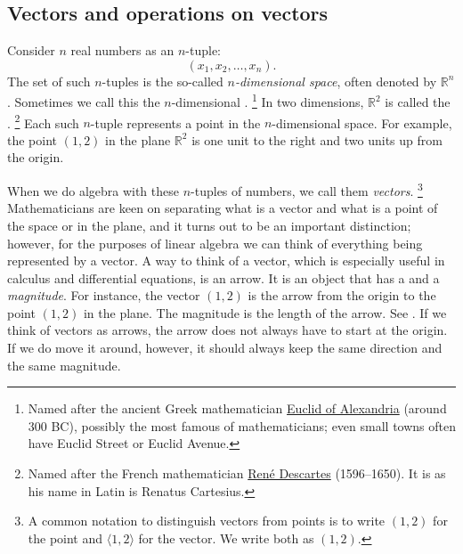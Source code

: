 \subsection{Vectors and operations on vectors}

Consider $n$ real numbers as an $n$-tuple:
\begin{equation*}
(x_1,x_2,\ldots,x_n).
\end{equation*}
The set of such $n$-tuples is the so-called
\emph{$n$-dimensional space},
often denoted by ${\mathbb R}^n$.
Sometimes we call this the $n$-dimensional
\emph{}.%
\footnote{Named after the ancient Greek mathematician
\href{https://en.wikipedia.org/wiki/Euclid}{Euclid of Alexandria}
(around 300 BC), possibly the most famous of mathematicians; even
small towns often have Euclid Street or Euclid Avenue.}
In two dimensions, ${\mathbb R}^2$ is called the
\emph{}.%
\footnote{Named after the French mathematician
\href{https://en.wikipedia.org/wiki/Descartes}{Ren\'e Descartes}
(1596--1650).  It is  as his name in Latin is Renatus
Cartesius.}
Each such $n$-tuple represents a point in the $n$-dimensional space.
For example, the point
$(1,2)$ in the plane ${\mathbb R}^2$
is one unit to the right and two units up from the
origin.

When we do algebra with these $n$-tuples of numbers, we call them
\emph{vectors}.%
\footnote{%
A common notation to distinguish vectors from points is to write $(1,2)$
for the point and $\langle 1,2 \rangle$ for the vector.  We write both as
$(1,2)$.}
Mathematicians are keen on separating
what is a vector and what is a point of the space or in the plane,
and it turns out
to be an important distinction; however, for the purposes of linear algebra
we can think of everything being represented by a vector.
A way to think of a vector, which is especially useful in calculus
and differential equations, is an arrow.  It is an object that has
a \emph{} and a \emph{magnitude}.
For instance, the vector $(1,2)$
is the arrow from the origin to the point $(1,2)$ in the plane.
The magnitude is the length of the arrow.
See .
If we think of vectors as arrows,
the arrow does not always have to start at the origin.  If we do move it
around, however, it should always keep the same direction and the same magnitude.

\begin{myfig}
\capstart
{}
\caption{The vector $(1,2)$ drawn as an arrow from the origin to the point
$(1,2)$.\label{linalg-vecarrow:fig}}
\end{myfig}

